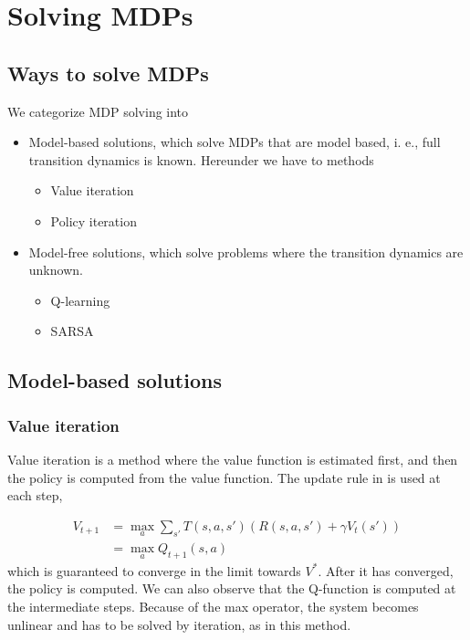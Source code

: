 \section{Solving MDPs}
\label{sec:solve}

\subsection{Ways to solve MDPs}

We categorize MDP solving into

\begin{itemize}
    \item Model-based solutions, which solve MDPs that are model based, i. e., full transition dynamics is known. Hereunder we have to methods
    \begin{itemize}
        \item Value iteration
        \item Policy iteration
    \end{itemize}
    \item Model-free solutions, which solve problems where the transition dynamics are unknown.
    \begin{itemize}
        \item Q-learning
        \item SARSA
    \end{itemize}
\end{itemize}

\subsection{Model-based solutions}

\subsubsection{Value iteration}

Value iteration is a method where the value function is estimated first, and then the policy is computed from the value function. The update rule in  is used at each step,

\begin{align}
    V_{t+1} &= \max_a \sum_{s'} T(s, a, s')(R(s, a, s') + \gamma V_t(s')) \\
    &= \max_a Q_{t+1}(s, a)
    \label{eq:update_V}
\end{align}
which is guaranteed to converge in the limit towards $V^*$. After it has converged, the policy is computed. We can also observe that the Q-function is computed at the intermediate steps. Because of the max operator, the system becomes unlinear and has to be solved by iteration, as in this method.

